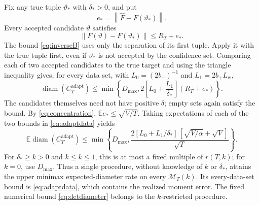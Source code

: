 \documentclass[11pt,a4paper]{article}
\numberwithin{equation}{section}
\newcommand{\E}{\mathbb E}
\newcommand{\cM}{\mathcal M}
\newcommand{\norm}[1]{\left\lVert #1\right\rVert}
\DeclareMathOperator{\diam}{diam}
\begin{document}
Fix any true tuple \(\vartheta_*\) with \(\delta_*>0\), and put
\[
 e_*=\norm{\widehat F-F(\vartheta_*)}.
\]
Every accepted candidate \(\vartheta\) satisfies
\[
 \norm{F(\vartheta)-F(\vartheta_*)}\le R_T+e_*.
\]
The bound \eqref{eq:inverseB} uses only the separation of its first tuple.
Apply it with the true tuple first, even if \(\vartheta_*\) is not
accepted by the confidence set. Comparing each of two accepted
candidates to the true target and using the triangle inequality gives,
for every data set, with \(L_0=(2b_-)^{-1}\) and
\(L_1=2b_+L_{\mathrm w}\),
\begin{equation}\label{eq:adaptdata}
 \diam(C_T^{\mathrm{adapt}})
 \le\min\left\{D_{\max},
       2\left[L_0+\frac{L_1}{\delta_*}\right](R_T+e_*)\right\}.
\end{equation}
The candidates themselves need not have positive \(\delta\);
empty sets again satisfy the bound.
By \eqref{eq:concentration}, \(\E e_*\le\sqrt{V/T}\).
Taking expectations of each of the two bounds in
\eqref{eq:adaptdata} yields
\begin{equation}\label{eq:adaptexpectation}
 \E\diam(C_T^{\mathrm{adapt}})
 \le\min\left\{D_{\max},
 \frac{2[L_0+L_1/\delta_*]\,[\sqrt{V/\alpha}+\sqrt V]}{\sqrt T}
 \right\}.
\end{equation}
For \(\delta_*\ge k>0\) and \(k\le\bar k\le1\), this is at most a fixed
multiple of \(r(T,k)\); for \(k=0\), use \(D_{\max}\).
Thus a single procedure, without knowledge of \(k\) or \(\delta_*\),
attains the upper minimax expected-diameter rate on every \(\cM_T(k)\).
Its every-data-set bound is \eqref{eq:adaptdata}, which contains the
realized moment error. The fixed numerical bound
\eqref{eq:detdiameter} belongs to the \(k\)-restricted procedure.
\end{document}

